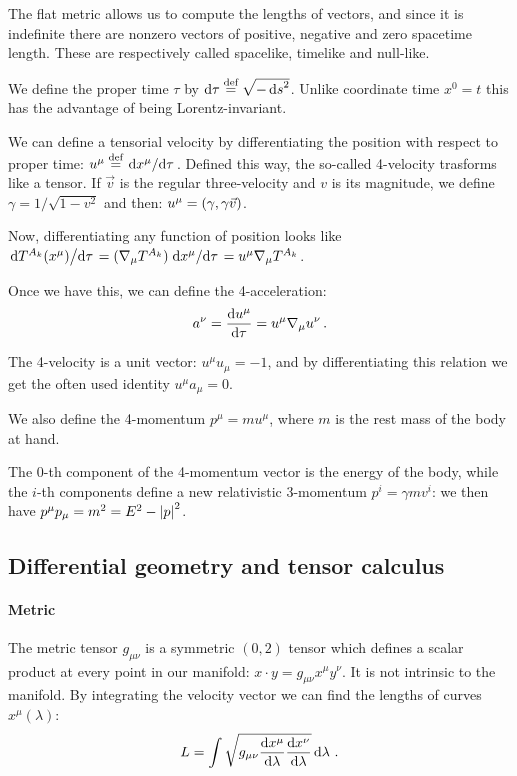 \documentclass[main.tex]{subfiles}
\begin{document}
The flat metric allows us to compute the lengths of vectors, and since it is indefinite there are nonzero vectors of positive, negative and zero spacetime length. These are respectively called spacelike, timelike and null-like.

We define the proper time \(\tau\) by \(\dd{\tau} \stackrel{\text{def}}{=} \sqrt{-\dd{s}^2} \). Unlike coordinate time \(x^0 = t\) this has the advantage of being Lorentz-invariant.

We can define a tensorial velocity by differentiating the position with respect to proper time: \(u^\mu \stackrel{\text{def}}{=} \dv*{x^\mu}{\tau}\). Defined this way, the so-called 4-velocity trasforms like a tensor. If \(\vec{v}\) is the regular three-velocity and \(v\) is its magnitude, we define \(\gamma = 1/\sqrt{1-v^2} \) and then:
\(u^\mu = \qty(\gamma, \gamma \vec{v})\).

Now, differentiating any function of position looks like \(\dv*{T^{A_k}(x^\mu)}{\tau} = (\nabla_\mu T^{A_k}) \dv*{x^\mu}{\tau} = u^\mu \nabla_\mu T^{A_k} \).

Once we have this, we can define the 4-acceleration:
\begin{equation} \label{eq:covariant-acceleration-def}
    a^\nu = \dv{u^\mu}{\tau}  = u^\mu \nabla_\mu u^\nu \,.
\end{equation}

The 4-velocity is a unit vector: \(u^\mu u_\mu = -1\), and by differentiating this relation we get the often used identity \(u^\mu a_\mu = 0\).

We also define the 4-momentum \(p^\mu = m u^\mu\), where \(m\) is the rest mass of the body at hand.

The 0-th component of the 4-momentum vector is the energy of the body, while the $i$-th components define a new relativistic 3-momentum \(p^i = \gamma m v^i\): we then have $p^\mu p_\mu = m^2 = E^2 - \abs{p}^2$.

\subsection{Differential geometry and tensor calculus}

\paragraph{Metric}

The metric tensor \(g_{\mu\nu}\) is a symmetric \((0,2)\) tensor which defines a scalar product at every point in our manifold: \(x \cdot y = g_{\mu\nu} x^\mu y^\nu\).
It is not intrinsic to the manifold.
By integrating the velocity vector we can find the lengths of curves \(x^\mu(\lambda)\):
\begin{equation}
    L = \int \sqrt{g_{\mu\nu} \dv{x^\mu}{\lambda} \dv{x^\nu}{\lambda} }  \dd{\lambda} \,.
\end{equation}
\end{document}
